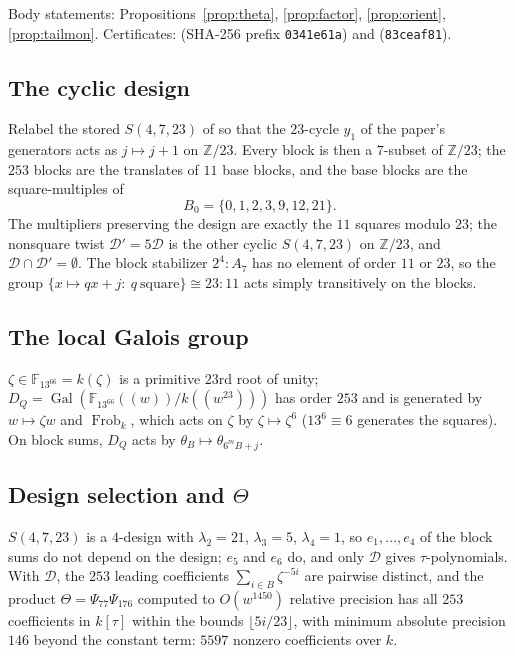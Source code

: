 \documentclass[11pt]{amsart}
\newcommand{\ZZ}{\mathbb{Z}}
\newcommand{\FF}{\mathbb{F}}
\newcommand{\Frob}{\operatorname{Frob}}
\newcommand{\Gal}{\operatorname{Gal}}
\theoremstyle{plain}
\theoremstyle{definition}
\begin{document}
Body statements: Propositions~\ref{prop:theta}, \ref{prop:factor},
\ref{prop:orient}, \ref{prop:tailmon}. Certificates:
 (SHA-256 prefix \texttt{0341e61a})
and  (\texttt{83ceaf81}).

\subsection*{The cyclic design}
Relabel the stored $S(4,7,23)$ of \cite{seven} so that the $23$-cycle
$y_1$ of the paper's generators acts as $j\mapsto j+1$ on $\ZZ/23$.
Every block is then a $7$-subset of $\ZZ/23$; the $253$ blocks are the
translates of $11$ base blocks, and the base blocks are the
square-multiples of
\[
  B_0=\{0,1,2,3,9,12,21\} .
\]
The multipliers preserving the design are exactly the $11$ squares
modulo $23$; the nonsquare twist $\mathcal D'=5\mathcal D$ is the other
cyclic $S(4,7,23)$ on $\ZZ/23$, and $\mathcal D\cap\mathcal D'=\emptyset$.
The block stabilizer $2^4{:}A_7$ has no element of order $11$ or $23$,
so the group $\{x\mapsto qx+j:\ q\ \text{square}\}\cong23{:}11$ acts
simply transitively on the blocks.

\subsection*{The local Galois group}
$\zeta\in\FF_{13^{66}}=k(\zeta)$ is a primitive $23$rd root of unity;
$D_Q=\Gal(\FF_{13^{66}}((w))/k((w^{23})))$ has order $253$ and is
generated by $w\mapsto\zeta w$ and $\Frob_k$, which acts on $\zeta$ by
$\zeta\mapsto\zeta^6$ ($13^6\equiv6$ generates the squares). On block
sums, $D_Q$ acts by $\theta_B\mapsto\theta_{6^mB+j}$.

\subsection*{Design selection and $\Theta$}
$S(4,7,23)$ is a $4$-design with $\lambda_2=21$, $\lambda_3=5$,
$\lambda_4=1$, so $e_1,\dots,e_4$ of the block sums do not depend on
the design; $e_5$ and $e_6$ do, and only $\mathcal D$ gives
$\tau$-polynomials. With $\mathcal D$, the $253$ leading coefficients
$\sum_{i\in B}\zeta^{-5i}$ are pairwise distinct, and the product
$\Theta=\Psi_{77}\Psi_{176}$ computed to $O(w^{1450})$ relative
precision has all $253$ coefficients in $k[\tau]$ within the bounds
$\lfloor5i/23\rfloor$, with minimum absolute precision $146$ beyond the
constant term: $5597$ nonzero coefficients over $k$.
\end{document}
